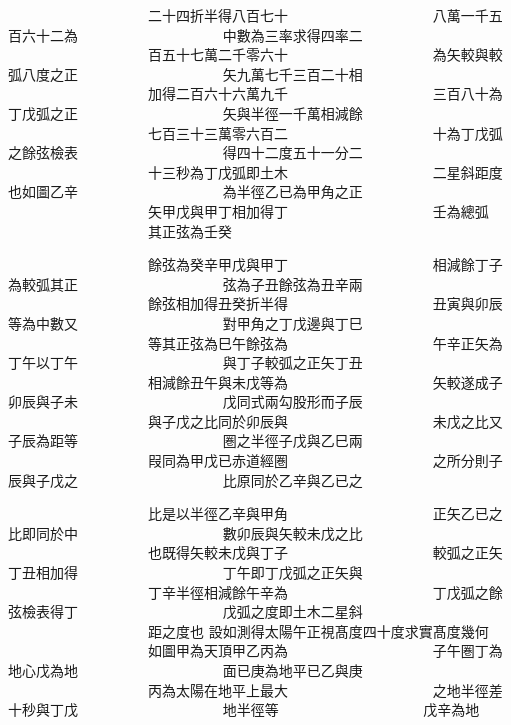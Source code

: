 \begin{正文}
　　　　　　　　　　二十四折半得八百七十
　　　　　　　　　　八萬一千五百六十二為
　　　　　　　　　　中數為三率求得四率二
　　　　　　　　　　百五十七萬二千零六十
　　　　　　　　　　為矢較與較弧八度之正
　　　　　　　　　　矢九萬七千三百二十相
　　　　　　　　　　加得二百六十六萬九千
　　　　　　　　　　三百八十為丁戊弧之正
　　　　　　　　　　矢與半徑一千萬相減餘
　　　　　　　　　　七百三十三萬零六百二
　　　　　　　　　　十為丁戊弧之餘弦檢表
　　　　　　　　　　得四十二度五十一分二
　　　　　　　　　　十三秒為丁戊弧即土木
　　　　　　　　　　二星斜距度也如圖乙辛
　　　　　　　　　　為半徑乙已為甲角之正
　　　　　　　　　　矢甲戊與甲丁相加得丁
　　　　　　　　　　壬為總弧
　　　　　　　　　　其正弦為壬癸
\par
\end{正文}\clearpage
{}
\begin{正文}
　　　　　　　　　　餘弦為癸辛甲戊與甲丁
　　　　　　　　　　相減餘丁子為較弧其正
　　　　　　　　　　弦為子丑餘弦為丑辛兩
　　　　　　　　　　餘弦相加得丑癸折半得
　　　　　　　　　　丑寅與卯辰等為中數又
　　　　　　　　　　對甲角之丁戊邊與丁巳
　　　　　　　　　　等其正弦為巳午餘弦為
　　　　　　　　　　午辛正矢為丁午以丁午
　　　　　　　　　　與丁子較弧之正矢丁丑
　　　　　　　　　　相減餘丑午與未戊等為
　　　　　　　　　　矢較遂成子卯辰與子未
　　　　　　　　　　戊同式兩勾股形而子辰
　　　　　　　　　　與子戊之比同於卯辰與
　　　　　　　　　　未戊之比又子辰為距等
　　　　　　　　　　圏之半徑子戊與乙巳兩
　　　　　　　　　　叚同為甲戊已赤道經圏
　　　　　　　　　　之所分則子辰與子戊之
　　　　　　　　　　比原同於乙辛與乙已之
\par
\end{正文}\clearpage
{}
\begin{正文}
　　　　　　　　　　比是以半徑乙辛與甲角
　　　　　　　　　　正矢乙已之比即同於中
　　　　　　　　　　數卯辰與矢較未戊之比
　　　　　　　　　　也既得矢較未戊與丁子
　　　　　　　　　　較弧之正矢丁丑相加得
　　　　　　　　　　丁午即丁戊弧之正矢與
　　　　　　　　　　丁辛半徑相減餘午辛為
　　　　　　　　　　丁戊弧之餘弦檢表得丁
　　　　　　　　　　戊弧之度即土木二星斜
　　　　　　　　　　距之度也
設如測得太陽午正視髙度四十度求實髙度幾何
　　　　　　　　　　如圖甲為天頂甲乙丙為
　　　　　　　　　　子午圏丁為地心戊為地
　　　　　　　　　　面已庚為地平已乙與庚
　　　　　　　　　　丙為太陽在地平上最大
　　　　　　　　　　之地半徑差十秒與丁戊
　　　　　　　　　　地半徑等
　　　　　　　　　　戊辛為地
\par
\end{正文}\clearpage
